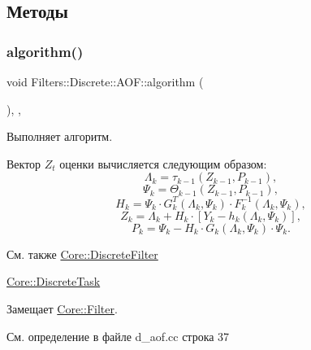 \subsection{Методы}
\hypertarget{class_filters_1_1_discrete_1_1_a_o_f_a22cbbf1054a17045c5e91ed7c5cba387}{}\label{class_filters_1_1_discrete_1_1_a_o_f_a22cbbf1054a17045c5e91ed7c5cba387} 
\subsubsection{\texorpdfstring{algorithm()}{algorithm()}}
{\footnotesize\ttfamily void Filters\+::\+Discrete\+::\+A\+O\+F\+::algorithm (\begin{DoxyParamCaption}{ }\end{DoxyParamCaption})\hspace{0.3cm}{\ttfamily [override]}, {\ttfamily [protected]}, {\ttfamily [virtual]}}



Выполняет алгоритм. 

Вектор $Z_t$ оценки вычисляется следующим образом\+: \[\Lambda_k = \tau_{k-1}(Z_{k-1}, P_{k-1}),\] \[\Psi_k = \Theta_{k-1}(Z_{k-1}, P_{k-1}),\] \[H_k = \Psi_k \cdot G_k^T(\Lambda_k, \Psi_k) \cdot F_k^{-1}(\Lambda_k, \Psi_k),\] \[Z_k = \Lambda_k + H_k \cdot [Y_k - h_k(\Lambda_k, \Psi_k)],\] \[P_k = \Psi_k - H_k \cdot G_k(\Lambda_k, \Psi_k) \cdot \Psi_k.\]

\begin{DoxySeeAlso}{См. также}
\hyperlink{class_core_1_1_discrete_filter}{Core\+::\+Discrete\+Filter} 

\hyperlink{class_core_1_1_discrete_task}{Core\+::\+Discrete\+Task} 
\end{DoxySeeAlso}


Замещает \hyperlink{class_core_1_1_filter_a438681ee3e54aba2148042d9f8011ab8}{Core\+::\+Filter}.



См. определение в файле d\+\_\+aof.\+cc строка 37

\hypertarget{class_filters_1_1_discrete_1_1_a_o_f_aa822fe74d7ca160f898db1c1289e17f7}{}\label{class_filters_1_1_discrete_1_1_a_o_f_aa822fe74d7ca160f898db1c1289e17f7} 
